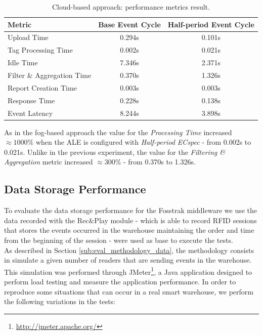 \begin{table}[ht!]
  \centering
    \begin{tabular}{|l|c|c|}
    \hline
    Metric                     & Base Event Cycle & Half-period Event Cycle \\ \hline
    Upload Time                & 0.294s           & 0.101s                  \\ \hline
    Tag Processing Time        & 0.002s           & 0.021s                  \\ \hline
    Idle Time                  & 7.346s           & 2.371s                  \\ \hline
    Filter \& Aggregation Time & 0.370s           & 1.326s                  \\ \hline
    Report Creation Time       & 0.003s           & 0.003s                  \\ \hline
    Response Time              & 0.228s           & 0.138s                  \\ \hline
    Event Latency              & 8.244s           & 3.898s                  \\ \hline
    \end{tabular}
  \caption{Cloud-based approach: performance metrics result.}
  \label{table:cloud_metrics}
\end{table}

As in the fog-based approach the value for the \textit{Processing Time} increased $\approx1000\%$ when
the \gls{ALE} is configured with \textit{Half-period ECspec} - from 0.002s to 0.021s. Unlike in the
previous experiment, the value for the \textit{Filtering \& Aggregation} metric increased $\approx300\%$
- from 0.370s to 1.326s.

\subsection{Data Storage Performance}
\label{sub:eval_exp_data}
To evaluate the data storage performance for the Fosstrak middleware we use the data recorded with the Rec\&Play
module - which is able to record \gls{RFID} sessions that stores the events occurred in the warehouse
maintaining the order and time from the beginning of the session - were used as base to execute
the tests.\\

As described in Section \ref{sub:eval_methodology_data}, the methodology consists in simulate a given
number of readers that are sending events in the warehouse. This simulation was performed through JMeter\footnote{\url{http://jmeter.apache.org/}},
a Java application designed to perform load testing and measure the application performance.
In order to reproduce some situations that can occur in a real smart warehouse, we perform the following
variations in the tests:

